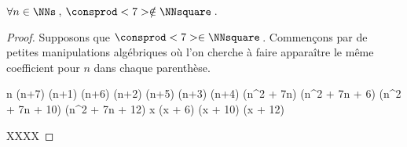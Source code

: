 \begin{fact} \label{case-8}
	 $\forall n \in \NNs$\,, $\consprod<7> \notin \NNsquare$\,.
\end{fact}




\begin{proof}
    Supposons que $\consprod<7> \in \NNsquare$\,.
    Commençons par de petites manipulations algébriques où l'on cherche à faire apparaître le même coefficient pour $n$ dans chaque parenthèse.
    
    \medskip
    \begin{stepcalc}[style = sar]
	\explnext{}
		n (n+7) \cdot (n+1) (n+6) \cdot (n+2) (n+5) \cdot (n+3) (n+4)
	\explnext{}
		(n^2 + 7n) (n^2 + 7n + 6) (n^2 + 7n + 10) (n^2 + 7n + 12)
		x (x + 6) (x + 10) (x + 12)
    \end{stepcalc}
  
    \medskip
    XXXX
\end{proof}

